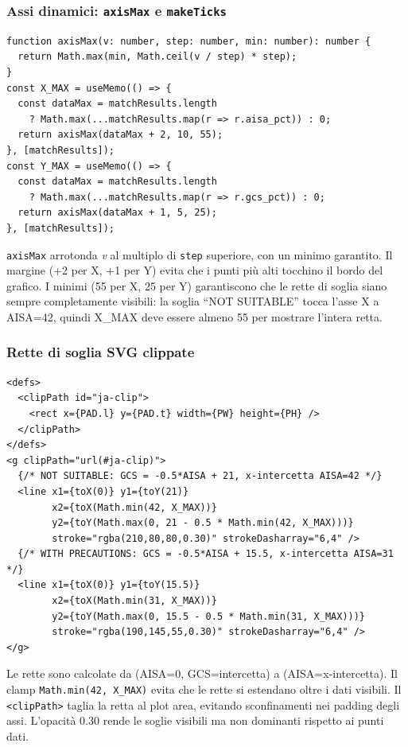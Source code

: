 \documentclass[a4paper,12pt]{article}
\begin{document}
\subsubsection{Assi dinamici: \texttt{axisMax} e \texttt{makeTicks}}

\begin{lstlisting}
function axisMax(v: number, step: number, min: number): number {
  return Math.max(min, Math.ceil(v / step) * step);
}
const X_MAX = useMemo(() => {
  const dataMax = matchResults.length
    ? Math.max(...matchResults.map(r => r.aisa_pct)) : 0;
  return axisMax(dataMax + 2, 10, 55);
}, [matchResults]);
const Y_MAX = useMemo(() => {
  const dataMax = matchResults.length
    ? Math.max(...matchResults.map(r => r.gcs_pct)) : 0;
  return axisMax(dataMax + 1, 5, 25);
}, [matchResults]);
\end{lstlisting}

\noindent \texttt{axisMax} arrotonda \textit{v} al multiplo di \texttt{step}
superiore, con un minimo garantito. Il margine (+2 per X, +1 per Y)
evita che i punti pi\`{u} alti tocchino il bordo del grafico. I minimi
(55 per X, 25 per Y) garantiscono che le rette di soglia siano sempre
completamente visibili: la soglia ``NOT SUITABLE'' tocca l'asse X a
AISA=42, quindi X\_MAX deve essere almeno 55 per mostrare l'intera retta.

\subsubsection{Rette di soglia SVG clippate}
\vspace{2pt}
\begin{lstlisting}
<defs>
  <clipPath id="ja-clip">
    <rect x={PAD.l} y={PAD.t} width={PW} height={PH} />
  </clipPath>
</defs>
<g clipPath="url(#ja-clip)">
  {/* NOT SUITABLE: GCS = -0.5*AISA + 21, x-intercetta AISA=42 */}
  <line x1={toX(0)} y1={toY(21)}
        x2={toX(Math.min(42, X_MAX))}
        y2={toY(Math.max(0, 21 - 0.5 * Math.min(42, X_MAX)))}
        stroke="rgba(210,80,80,0.30)" strokeDasharray="6,4" />
  {/* WITH PRECAUTIONS: GCS = -0.5*AISA + 15.5, x-intercetta AISA=31 */}
  <line x1={toX(0)} y1={toY(15.5)}
        x2={toX(Math.min(31, X_MAX))}
        y2={toY(Math.max(0, 15.5 - 0.5 * Math.min(31, X_MAX)))}
        stroke="rgba(190,145,55,0.30)" strokeDasharray="6,4" />
</g>
\end{lstlisting}

\noindent Le rette sono calcolate da (AISA=0, GCS=intercetta) a (AISA=x-intercetta).
Il clamp \texttt{Math.min(42, X\_MAX)} evita che le rette si estendano
oltre i dati visibili. Il \texttt{<clipPath>} taglia la retta al plot area,
evitando sconfinamenti nei padding degli assi. L'opacit\`{a} 0.30
rende le soglie visibili ma non dominanti rispetto ai punti dati.
\end{document}
